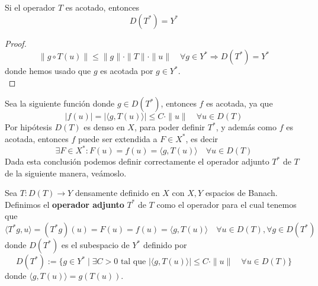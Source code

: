 \begin{prop}
    Si el operador $T$ es acotado, entonces
    \begin{equation*}
        D(T^*) = Y^*
    \end{equation*}
\begin{proof}
    \begin{equation*}
        \| g \circ T(u) \| \le \|g\| \cdot \|T\| \cdot \|u\| \quad \forall g \in Y^* \Rightarrow D(T^*) = Y^*
    \end{equation*}
    donde hemos usado que $g$ es acotada por $g\in Y^*$. \\
\end{proof}
\end{prop}

\noindent
Sea la siguiente función
donde $g \in D(T^*)$, entonces $f$ es acotada, ya que 
\begin{equation*}
    |f(u)| = |\langle g, T(u) \rangle| \le C \cdot \|u\| \quad \forall u \in D(T)
\end{equation*}
Por hipótesis $D(T)$ es denso en $X$, para poder definir $T^*$, y además como $f$ es acotada, entonces $f$ puede ser extendida a $F \in X^*$, es decir
\begin{equation*}
    \exists F \in X^* : F(u) = f(u) = \langle g, T(u) \rangle \quad \forall u \in D(T)
\end{equation*}
Dada esta conclusión podemos definir correctamente el operador adjunto $T^*$ de $T$ de la siguiente manera, veámoslo. \\

\begin{definicion}
    Sea $T: D(T) \longrightarrow Y$ densamente definido en $X$ con $X, Y$ espacios de Banach. Definimos el \textbf{operador adjunto} $T^*$ de $T$ como el operador
    para el cual tenemos que 
    \begin{equation*}
        \langle T^*g, u \rangle = (T^*g)(u) = F(u) = f(u) = \langle g, T(u) \rangle \quad \forall u \in D(T), \forall g \in D(T^*) 
    \end{equation*}
    donde $D(T^*)$ es el subespacio de $Y^*$ definido por
    \begin{equation*}
        D(T^*):= \{ g \in Y^* \mid \exists C > 0 \text{ tal que } |\langle g, T(u) \rangle| \le C \cdot \|u\| \quad \forall u \in D(T) \}
    \end{equation*}
    donde $\langle g, T(u) \rangle = g(T(u))$. \\
\end{definicion}

